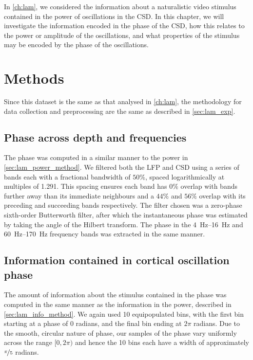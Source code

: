 
In \autoref{ch:lam}, we considered the information about a naturalistic video stimulus contained in the power of oscillations in the \ac{CSD}.
In this chapter, we will investigate the information encoded in the phase of the \ac{CSD}, how this relates to the power or amplitude of the oscillations, and what properties of the stimulus may be encoded by the phase of the oscillations.


\section{Methods}

Since this dataset is the same as that analysed in \autoref{ch:lam}, the methodology for data collection and preprocessing are the same as described in \autoref{sec:lam_exp}.


\subsection{Phase across depth and frequencies}
\label{sec:lam_phase_method}

The phase was computed in a similar manner to the power in \autoref{sec:lam_power_method}.
We filtered both the \ac{LFP} and \ac{CSD} using a series of bands each with a fractional bandwidth of $50\%$, spaced logarithmically at multiples of \num{1.291}.
This spacing ensures each band has $0\%$ overlap with bands further away than its immediate neighbours and a $44\%$ and $56\%$ overlap with its preceding and succeeding bands respectively.
The filter chosen was a zero-phase sixth-order Butterworth filter, after which the instantaneous phase was estimated by taking the angle of the Hilbert transform.
The phase in the \SIrange{4}{16}{Hz} and \SIrange{60}{170}{Hz} frequency bands was extracted in the same manner.


\subsection{Information contained in cortical oscillation phase}

The amount of information about the stimulus contained in the phase was computed in the same manner as the information in the power, described in \autoref{sec:lam_info_method}.
We again used \num{10} equipopulated bins, with the first bin starting at a phase of $0$ radians, and the final bin ending at $2\pi$ radians.
Due to the smooth, circular nature of phase, our samples of the phase vary uniformly across the range $[0, 2\pi)$ and hence the \num{10} bins each have a width of approximately $\nicefrac{\pi}{5}$ radians.


